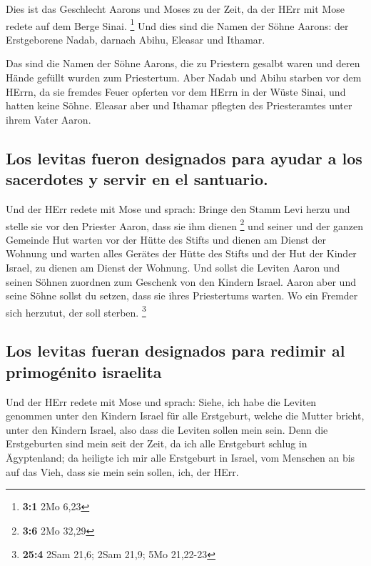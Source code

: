  Dies ist das Geschlecht Aarons und Moses zu der Zeit, da
der HErr mit Mose redete auf dem Berge Sinai. \footnote{\textbf{3:1} 2Mo
  6,23}  Und dies sind die Namen der Söhne Aarons: der
Erstgeborene Nadab, darnach Abihu, Eleasar und Ithamar.

 Das sind die Namen der Söhne Aarons, die zu Priestern
gesalbt waren und deren Hände gefüllt wurden zum Priestertum.
 Aber Nadab und Abihu starben vor dem HErrn, da sie
fremdes Feuer opferten vor dem HErrn in der Wüste Sinai, und hatten
keine Söhne. Eleasar aber und Ithamar pflegten des Priesteramtes unter
ihrem Vater Aaron.

\hypertarget{los-levitas-fueron-designados-para-ayudar-a-los-sacerdotes-y-servir-en-el-santuario.}{%
\subsection{Los levitas fueron designados para ayudar a los sacerdotes y
servir en el
santuario.}\label{los-levitas-fueron-designados-para-ayudar-a-los-sacerdotes-y-servir-en-el-santuario.}}

 Und der HErr redete mit Mose und sprach: 
Bringe den Stamm Levi herzu und stelle sie vor den Priester Aaron, dass
sie ihm dienen \footnote{\textbf{3:6} 2Mo 32,29}  und
seiner und der ganzen Gemeinde Hut warten vor der Hütte des Stifts und
dienen am Dienst der Wohnung  und warten alles Gerätes der
Hütte des Stifts und der Hut der Kinder Israel, zu dienen am Dienst der
Wohnung.  Und sollst die Leviten Aaron und seinen Söhnen
zuordnen zum Geschenk von den Kindern Israel.  Aaron aber
und seine Söhne sollst du setzen, dass sie ihres Priestertums warten. Wo
ein Fremder sich herzutut, der soll sterben. \footnote{\textbf{25:4}
  2Sam 21,6; 2Sam 21,9; 5Mo 21,22-23}

\hypertarget{los-levitas-fueran-designados-para-redimir-al-primoguxe9nito-israelita}{%
\subsection{Los levitas fueran designados para redimir al primogénito
israelita}\label{los-levitas-fueran-designados-para-redimir-al-primoguxe9nito-israelita}}

 Und der HErr redete mit Mose und sprach: 
Siehe, ich habe die Leviten genommen unter den Kindern Israel für alle
Erstgeburt, welche die Mutter bricht, unter den Kindern Israel, also
dass die Leviten sollen mein sein.  Denn die Erstgeburten
sind mein seit der Zeit, da ich alle Erstgeburt schlug in Ägyptenland;
da heiligte ich mir alle Erstgeburt in Israel, vom Menschen an bis auf
das Vieh, dass sie mein sein sollen, ich, der HErr.

